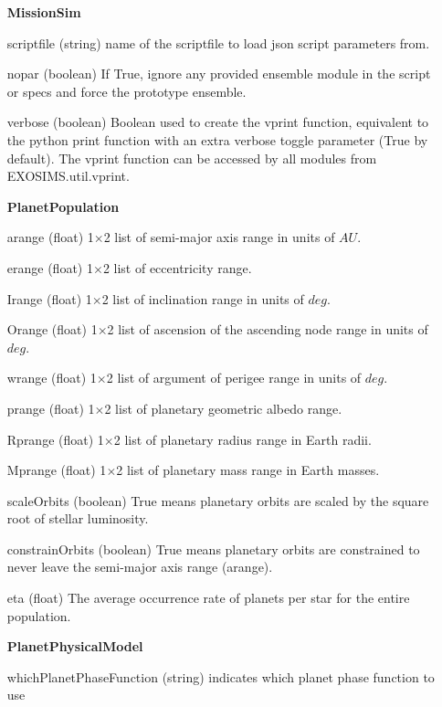 \documentclass[cleanfoot]{asme2ej}
\begin{document}
\begin{itemize}[leftmargin=1.5in,font={\ttfamily}]

\item[\textbf{MissionSim}]
\item[scriptfile] (string) name of the scriptfile to load json script parameters from.
\item[nopar] (boolean) If True, ignore any provided ensemble module in the script or specs and force the prototype ensemble.
\item[verbose] (boolean) Boolean used to create the vprint function, equivalent to the python print function with an extra verbose toggle parameter (True by default). The vprint function can be accessed by all modules from EXOSIMS.util.vprint.

\item[\textbf{PlanetPopulation}]
\item[arange] (float) 1$\times$2 list of semi-major axis range in units of $ AU $. 
\item[erange] (float) 1$\times$2 list of eccentricity range.
\item[Irange] (float) 1$\times$2 list of inclination range in units of $ deg $.  
\item[Orange] (float) 1$\times$2 list of ascension of the ascending node range in units of $ deg $.  
\item[wrange] (float) 1$\times$2 list of argument of perigee range in units of $ deg $. 
\item[prange] (float) 1$\times$2 list of planetary geometric albedo range.  
\item[Rprange] (float) 1$\times$2 list of planetary radius range in Earth radii.  
\item[Mprange] (float) 1$\times$2 list of planetary mass range in Earth masses.  
\item [scaleOrbits] (boolean) True means planetary orbits are scaled by the square root of stellar luminosity. 
\item[constrainOrbits] (boolean) True means planetary orbits are constrained to never leave the semi-major axis range (arange).
\item[eta] (float) The average occurrence rate of planets per star for the entire population.

\item[\textbf{PlanetPhysicalModel}]
\item[whichPlanetPhaseFunction] (string) indicates which planet phase function to use


\end{itemize}
\end{document}
